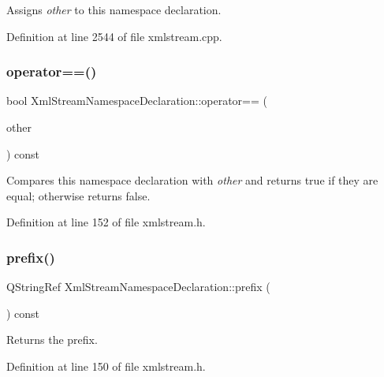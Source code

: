 Assigns {\itshape other} to this namespace declaration. 

Definition at line 2544 of file xmlstream.\+cpp.

\mbox{\label{class_xml_stream_namespace_declaration_acdd97a34672a888cd8bf2dc29b87b66e}} 
\subsubsection{\texorpdfstring{operator==()}{operator==()}}
{\footnotesize\ttfamily bool Xml\+Stream\+Namespace\+Declaration\+::operator== (\begin{DoxyParamCaption}\item[{const \hyperlink{class_xml_stream_namespace_declaration}{Xml\+Stream\+Namespace\+Declaration} \&}]{other }\end{DoxyParamCaption}) const\hspace{0.3cm}{\ttfamily [inline]}}

Compares this namespace declaration with {\itshape other} and returns {\ttfamily true} if they are equal; otherwise returns {\ttfamily false}. 

Definition at line 152 of file xmlstream.\+h.

\mbox{\label{class_xml_stream_namespace_declaration_a84440d3a55f8679da78032e02a49ccbd}} 
\subsubsection{\texorpdfstring{prefix()}{prefix()}}
{\footnotesize\ttfamily Q\+String\+Ref Xml\+Stream\+Namespace\+Declaration\+::prefix (\begin{DoxyParamCaption}{ }\end{DoxyParamCaption}) const\hspace{0.3cm}{\ttfamily [inline]}}

Returns the prefix. 

Definition at line 150 of file xmlstream.\+h.



